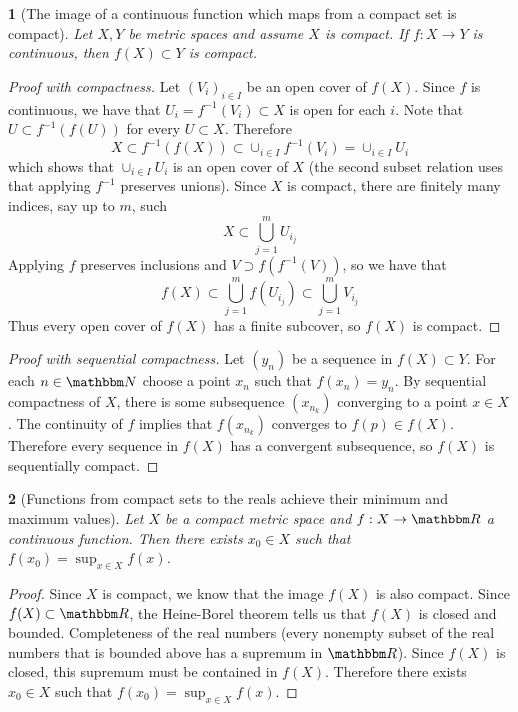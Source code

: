 \documentclass[12pt]{article}
\numberwithin{equation}{section}
\theoremstyle{plain}
\newtheorem{theorem}{\color{ForestGreen}{\textbf{Theorem}}}[section]
\theoremstyle{definition}
\newcommand\inv[1]{#1^{-1}}
\def\ss{\subset}
\newcommand{\1}{\mathbbm 1}
\newcommand{\RR}{\mathbbm R}
\newcommand{\NN}{\mathbbm N}
\begin{document}
\begin{theorem}[The image of a continuous function which maps from a compact set is compact]
	Let $X,Y$ be metric spaces and assume $X$ is compact. If $f: X \to Y$ is continuous, then $f(X) \subset Y$ is compact. 
\end{theorem}
\begin{proof}[Proof with compactness]
	Let $(V_i)_{i \in I}$ be an open cover of $f(X)$. Since $f$ is continuous, we have that $U_i = f^{-1}(V_i) \subset X$ is open for each $i$. Note that $U \ss \inv{f}(f(U))$ for every $U \subset X$. Therefore
	\begin{equation}
		X \ss \inv{f}(f(X)) \ss \cup_{i \in I} \inv{f}(V_{i}) = \cup_{i \in I} U_{i} 
	\end{equation}
	which shows that $\cup_{i \in I} U_{i}$ is an open cover of $X$ (the second subset relation uses that applying $f^{-1}$ preserves unions). Since $X$ is compact, there are finitely many indices, say up to $m$, such
	\begin{equation}
		X \ss \bigcup_{j=1}^m  U_{i_j}
	\end{equation}
	Applying $f$ preserves inclusions and $V \supset f(\inv{f}(V))$, so we have that
	\begin{equation}
		f(X) \ss \bigcup_{j=1}^m f(U_{i_j}) \ss \bigcup_{j=1}^m V_{i_j}
	\end{equation}
	Thus every open cover of $f(X)$ has a finite subcover, so $f(X)$ is compact. 
\end{proof}

\begin{proof}[Proof with sequential compactness]
	Let $(y_n)$ be a sequence in $f(X) \ss Y$. For each $n \in \NN$ choose a point $x_n$ such that $f(x_n) = y_n$. By sequential compactness of $X$, there is some subsequence $(x_{n_k})$ converging to a point $x \in X$. The continuity of $f$ implies that $f(x_{n_k})$ converges to $f(p) \in f(X)$. Therefore every sequence in $f(X)$ has a convergent subsequence, so $f(X)$ is sequentially compact.  
\end{proof}


\begin{theorem}[Functions from compact sets to the reals achieve their minimum and maximum values]
	Let $X$ be a compact metric space and $f:X \to \RR$ a continuous function. Then there exists $x_0 \in X$ such that $f(x_0) = \sup_{x\in X} f(x)$. 
\end{theorem}
\begin{proof}
	Since $X$ is compact, we know that the image $f(X)$ is also compact. Since $f(X) \ss \RR$, the Heine-Borel theorem tells us that $f(X)$ is closed and bounded. Completeness of the real numbers (every nonempty subset of the real numbers that is bounded above has a supremum in $\RR$). Since $f(X)$ is closed, this supremum must be contained in $f(X)$. Therefore there exists $x_0 \in X$ such that $f(x_0) = \sup_{x\in X} f(x)$. 
\end{proof}
\end{document}
